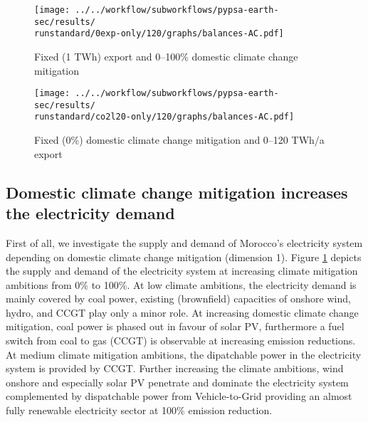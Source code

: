 \begin{figure*}[h!]
    \centering
    \begin{subfigure}[b]{0.49\linewidth}
        \centering
        \texttt{[image: ../../workflow/subworkflows/pypsa-earth-sec/results/\\runstandard/0exp-only/120/graphs/balances-AC.pdf]}
        \caption{Fixed (1 TWh) export and 0--100\% domestic climate change mitigation}
        \label{fig:balances-ac-0exp-120}
    \end{subfigure}
    \hfill
    \begin{subfigure}[b]{0.49\linewidth}
        \centering
        \texttt{[image: ../../workflow/subworkflows/pypsa-earth-sec/results/\\runstandard/co2l20-only/120/graphs/balances-AC.pdf]}
        \caption{Fixed (0\%) domestic climate change mitigation and 0--120 TWh/a export}
        \label{fig:balances-ac-co2l20-120}
    \end{subfigure}
    \hfill
    \caption{Electricity supply and demand at fixed export levels and increasing domestic climate change mitigation (\ref{fig:balances-ac-0exp-120}) and vice versa (\ref{fig:balances-ac-co2l20-120}). Increasing domestic climate change mitigation first phases out carbon-intensive coal generation in favor of CCGT, at medium to high domestic climate change mitigation the electricity system is fully renewable supported by flexibility through Vehicle-to-Grid (V2G) and sector coupling. Increasing electricity demands cover EVs and hydrogen generation for other sectors.
    At increasing hydrogen exports the additional electricity required for hydrogen electrolysis is covered by onshore wind and solar PV, as imposed by the temporal hydrogen regulation. 
    }
    \label{fig:balances-ac}
\end{figure*}


\subsection*{Domestic climate change mitigation increases the electricity demand}
\label{subsec:increase_limit}
First of all, we investigate the supply and demand of Morocco's electricity system depending on domestic climate change mitigation (dimension 1). Figure \ref{fig:balances-ac-0exp-120} depicts the supply and demand of the electricity system at increasing climate mitigation ambitions from 0\% to 100\%. At low climate ambitions, the electricity demand is mainly covered by coal power, existing (brownfield) capacities of onshore wind, hydro, and CCGT play only a minor role. 
At increasing domestic climate change mitigation, coal power is phased out in favour of solar PV, furthermore a fuel switch from coal to gas (CCGT) is observable at increasing emission reductions. At medium climate mitigation ambitions, the dipatchable power in the electricity system is provided by CCGT. 
Further increasing the climate ambitions, wind onshore and especially solar PV penetrate and dominate the electricity system complemented by dispatchable power from Vehicle-to-Grid providing an almost fully renewable electricity sector at 100\% emission reduction. 

